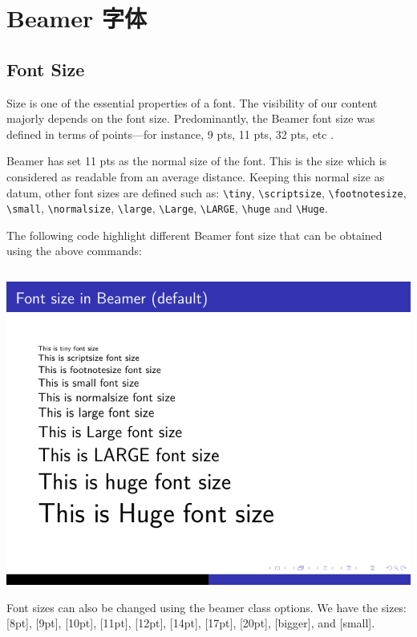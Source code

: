 \section{Beamer 字体}

\subsection{Font Size}

Size is one of the essential properties of a font. The visibility of our content majorly depends on the font size. Predominantly, the Beamer font size was defined in terms of points—for instance, 9 pts, 11 pts, 32 pts, etc .

Beamer has set 11 pts as the normal size of the font. This is the size which is considered as readable from an average distance. Keeping this normal size as datum, other font sizes are defined such as: 
\verb|\tiny|, \verb|\scriptsize|, \verb|\footnotesize|, \verb|\small|, \verb|\normalsize|, \verb|\large|, \verb|\Large|, \verb|\LARGE|, \verb|\huge| and \verb|\Huge|.

The following code highlight different Beamer font size that can be obtained using the above commands:

\inputminted[linenos=true]{latex}{examples/beamer/beamerfont01.tex}

\includegraphics{examples/beamer/beamerfont01.pdf}

Font sizes can also be changed using the beamer class options. We have the sizes: [8pt], [9pt], [10pt], [11pt], [12pt], [14pt], [17pt], [20pt], [bigger], and [small].

